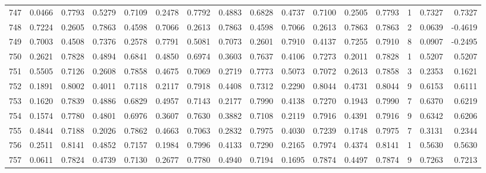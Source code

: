 \begin{tabular}{lrrrrrrrrrrrrrrr}
747 &      0.0466 &  0.7793 &  0.5279 &  0.7109 &  0.2478 &  0.7792 &  0.4883 &  0.6828 &  0.4737 &  0.7100 &   0.2505 &     0.7793 &      1 &                    0.7327 &                     0.7327 \\
748 &      0.7224 &  0.2605 &  0.7863 &  0.4598 &  0.7066 &  0.2613 &  0.7863 &  0.4598 &  0.7066 &  0.2613 &   0.7863 &     0.7863 &      2 &                    0.0639 &                    -0.4619 \\
749 &      0.7003 &  0.4508 &  0.7376 &  0.2578 &  0.7791 &  0.5081 &  0.7073 &  0.2601 &  0.7910 &  0.4137 &   0.7255 &     0.7910 &      8 &                    0.0907 &                    -0.2495 \\
750 &      0.2621 &  0.7828 &  0.4894 &  0.6841 &  0.4850 &  0.6974 &  0.3603 &  0.7637 &  0.4106 &  0.7273 &   0.2011 &     0.7828 &      1 &                    0.5207 &                     0.5207 \\
751 &      0.5505 &  0.7126 &  0.2608 &  0.7858 &  0.4675 &  0.7069 &  0.2719 &  0.7773 &  0.5073 &  0.7072 &   0.2613 &     0.7858 &      3 &                    0.2353 &                     0.1621 \\
752 &      0.1891 &  0.8002 &  0.4011 &  0.7118 &  0.2117 &  0.7918 &  0.4408 &  0.7312 &  0.2290 &  0.8044 &   0.4731 &     0.8044 &      9 &                    0.6153 &                     0.6111 \\
753 &      0.1620 &  0.7839 &  0.4886 &  0.6829 &  0.4957 &  0.7143 &  0.2177 &  0.7990 &  0.4138 &  0.7270 &   0.1943 &     0.7990 &      7 &                    0.6370 &                     0.6219 \\
754 &      0.1574 &  0.7780 &  0.4801 &  0.6976 &  0.3607 &  0.7630 &  0.3882 &  0.7108 &  0.2119 &  0.7916 &   0.4391 &     0.7916 &      9 &                    0.6342 &                     0.6206 \\
755 &      0.4844 &  0.7188 &  0.2026 &  0.7862 &  0.4663 &  0.7063 &  0.2832 &  0.7975 &  0.4030 &  0.7239 &   0.1748 &     0.7975 &      7 &                    0.3131 &                     0.2344 \\
756 &      0.2511 &  0.8141 &  0.4852 &  0.7157 &  0.1984 &  0.7996 &  0.4133 &  0.7290 &  0.2165 &  0.7974 &   0.4374 &     0.8141 &      1 &                    0.5630 &                     0.5630 \\
757 &      0.0611 &  0.7824 &  0.4739 &  0.7130 &  0.2677 &  0.7780 &  0.4940 &  0.7194 &  0.1695 &  0.7874 &   0.4497 &     0.7874 &      9 &                    0.7263 &                     0.7213 \\

\end{tabular}
